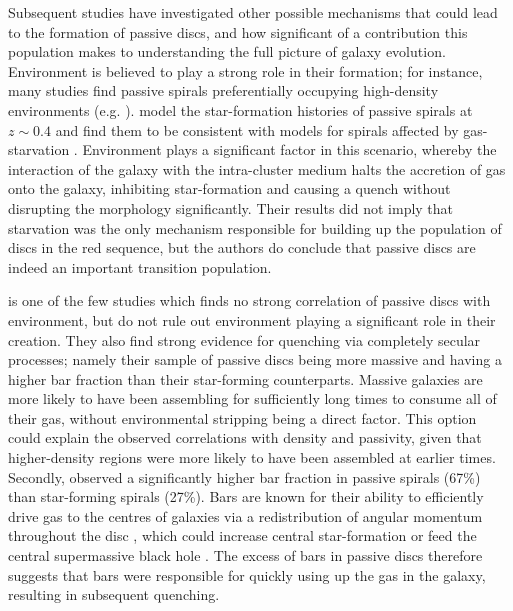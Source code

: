 \documentclass[useAMS,usenatbib]{mn2e}
\begin{document}
Subsequent studies have investigated other possible mechanisms that could lead to the formation of passive discs, and how significant of a contribution this population makes to understanding the full picture of galaxy evolution. Environment is believed to play a strong role in their formation; for instance, many studies find passive spirals preferentially occupying high-density environments (e.g. \citet{Dressler1999, Poggianti1999, Goto2003, Deng2009, Hughes2009}). \citet{Moran2006} model the star-formation histories of passive spirals at $z\sim0.4$ and find them to be consistent with models for spirals affected by gas-starvation \citep{Larson1980, Quilis2000, Bekki2002}. Environment plays a significant factor in this scenario, whereby the interaction of the galaxy with the intra-cluster medium halts the accretion of gas onto the galaxy, inhibiting star-formation and causing a quench without disrupting the morphology significantly. Their results did not imply that starvation was the only mechanism responsible for building up the population of discs in the red sequence, but the authors do conclude that passive discs are indeed an important transition population.

\citet{Masters2010} is one of the few studies which finds no strong correlation of passive discs with environment, but do not rule out environment playing a significant role in their creation. They also find strong evidence for quenching via completely secular processes; namely their sample of passive discs being more massive and having a higher bar fraction than their star-forming counterparts. Massive galaxies are more likely to have been assembling for sufficiently long times to consume all of their gas, without environmental stripping being a direct factor. This option could explain the observed correlations with density and passivity, given that higher-density regions were more likely to have been assembled at earlier times. Secondly, \citet{Masters2010} observed a significantly higher bar fraction in passive spirals (67\%) than star-forming spirals (27\%). Bars are known for their ability to efficiently drive gas to the centres of galaxies via a redistribution of angular momentum throughout the disc \citep{Sellwood1993,Shlosman1989,Ann2005}, which could increase central star-formation \citep{Hawarden1986,Ho1997} or feed the central supermassive black hole \citep{Athanassoula1992,Friedli1993}. The excess of bars in passive discs therefore suggests that bars were responsible for quickly using up the gas in the galaxy, resulting in subsequent quenching. 
\end{document}
